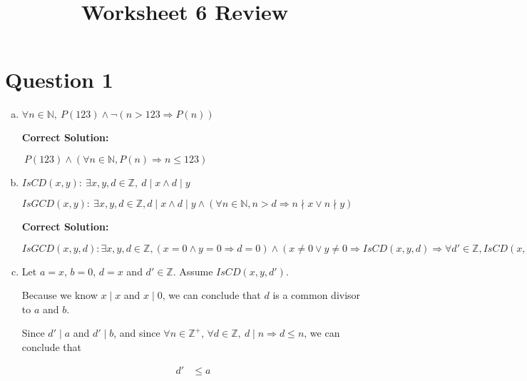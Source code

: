 \documentclass[12pt]{article}
\begin{document}
\title{Worksheet 6 Review}
\maketitle

\section*{Question 1}
\begin{enumerate}[a.]
    \item

    $\forall n \in \mathbb{N},\:P(123) \land \neg (n > 123 \Rightarrow P(n))$

    \bigskip

    \textbf{Correct Solution:}

    $\:P(123) \land (\forall n \in \mathbb{N}, P(n) \Rightarrow n \leq 123)$

    \item

    $IsCD(x,y):\:\exists x,y,d \in \mathbb{Z},\: d \mid x \land d \mid y$

    \bigskip

    $IsGCD(x,y):\:\exists x,y,d \in \mathbb{Z}, d \mid x \land d \mid y \land
    (\forall n \in \mathbb{N}, n > d \Rightarrow n \nmid x \lor n \nmid y)$

    \bigskip

    \textbf{Correct Solution:}

    $IsGCD(x,y,d):\exists x,y,d \in \mathbb{Z}, (x = 0 \land y = 0 \Rightarrow d = 0) \land (x \neq 0 \lor y \neq 0 \Rightarrow
    IsCD(x,y,d) \Rightarrow \forall d' \in \mathbb{Z}, IsCD(x,y,d') \Rightarrow d' \leq d)$

    \item

    Let $a = x$, $b = 0$, $d = x$ and $d' \in \mathbb{Z}$. Assume $IsCD(x,y,d')$.

    \bigskip

    Because we know $x \mid x$ and $x \mid 0$, we can conclude that $d$ is a common
    divisor to $a$ and $b$.

    \bigskip

    Since $d' \mid a$ and $d' \mid b$, and since $\forall n \in \mathbb{Z}^{+}$,
    $\forall d \in \mathbb{Z},\:d \mid n \Rightarrow d \leq n$, we can conclude
    that

    \begin{align}
        d' &\leq a
    \end{align}


\end{enumerate}
\end{document}
